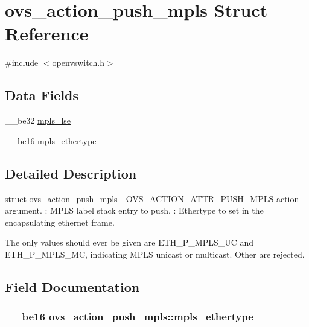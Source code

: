 \hypertarget{structovs__action__push__mpls}{}\section{ovs\+\_\+action\+\_\+push\+\_\+mpls Struct Reference}
\label{structovs__action__push__mpls}


{\ttfamily \#include $<$openvswitch.\+h$>$}

\subsection*{Data Fields}
\begin{DoxyCompactItemize}
\item 
\+\_\+\+\_\+be32 \hyperlink{structovs__action__push__mpls_a58c09de1a14973c13197f7748beb3803}{mpls\+\_\+lse}
\item 
\+\_\+\+\_\+be16 \hyperlink{structovs__action__push__mpls_adea8de7c1e924d0665c4eb62901ce521}{mpls\+\_\+ethertype}
\end{DoxyCompactItemize}


\subsection{Detailed Description}
struct \hyperlink{structovs__action__push__mpls}{ovs\+\_\+action\+\_\+push\+\_\+mpls} -\/ O\+V\+S\+\_\+\+A\+C\+T\+I\+O\+N\+\_\+\+A\+T\+T\+R\+\_\+\+P\+U\+S\+H\+\_\+\+M\+P\+L\+S action argument. \+: M\+P\+L\+S label stack entry to push. \+: Ethertype to set in the encapsulating ethernet frame.

The only values  should ever be given are E\+T\+H\+\_\+\+P\+\_\+\+M\+P\+L\+S\+\_\+\+U\+C and E\+T\+H\+\_\+\+P\+\_\+\+M\+P\+L\+S\+\_\+\+M\+C, indicating M\+P\+L\+S unicast or multicast. Other are rejected. 

\subsection{Field Documentation}
\hypertarget{structovs__action__push__mpls_adea8de7c1e924d0665c4eb62901ce521}{}
\subsubsection[{mpls\+\_\+ethertype}]{\setlength{\rightskip}{0pt plus 5cm}\+\_\+\+\_\+be16 ovs\+\_\+action\+\_\+push\+\_\+mpls\+::mpls\+\_\+ethertype}\label{structovs__action__push__mpls_adea8de7c1e924d0665c4eb62901ce521}
\hypertarget{structovs__action__push__mpls_a58c09de1a14973c13197f7748beb3803}{}

